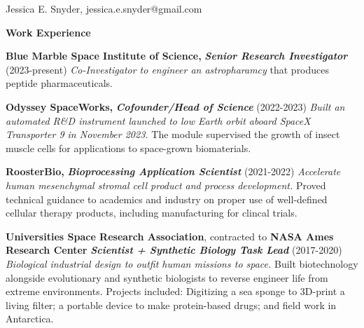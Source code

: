 \documentclass[11pt]{article}
\begin{document}
\thispagestyle{empty}

\begin{singlespace}
\begin{flushleft}




\begin{center}
\LARGE Jessica E. Snyder, \color{demphasize}{PhD} \break
\small jessica.e.snyder@gmail.com                  \href{https://biology.work/}{\color{demphasize}{} \color{demphasize}{https://biology.work/}} \break
{}
\end{center}


\vskip 0.1in
\textbf{\Large Work Experience} \vspace{-1em}
\vskip 0.2in

\textbf{Blue Marble Space Institute of Science,} \textit{ \textbf{Senior Research Investigator} }  (2023-present) \textit{Co-Investigator to engineer an astropharamcy} that produces peptide pharmaceuticals.
\vskip 0.05in


\textbf{Odyssey SpaceWorks,} \textit{ \textbf{Cofounder/Head of Science} }  (2022-2023) \textit{Built an automated R\&D instrument launched to low Earth orbit aboard SpaceX Transporter 9 in November 2023.}  The module supervised the growth of insect muscle cells for applications to space-grown biomaterials.
\vskip 0.05in

\textbf{RoosterBio,} \textit{ \textbf{Bioprocessing Application Scientist} }  (2021-2022) \textit{Accelerate human mesenchymal stromal cell product and process development.}  Proved technical guidance to academics and industry on proper use of well-defined cellular therapy products, including manufacturing for clincal trials.

\vskip 0.05in
\textbf{Universities Space Research Association}, contracted to \textbf{NASA Ames Research Center} \hfill \break
\textit{ \textbf{Scientist + Synthetic Biology Task Lead} }  (2017-2020) \textit{Biological industrial design to outfit human missions to space.} Built biotechnology alongside evolutionary and synthetic biologists to reverse engineer life from extreme environments. Projects included: Digitizing a sea sponge to 3D-print a living filter; a portable device to make protein-based drugs; and field work in Antarctica.


\end{flushleft}
\end{singlespace}
\end{document}
